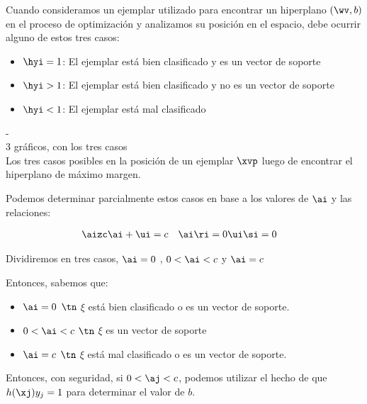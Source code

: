 Cuando consideramos un ejemplar utilizado para encontrar un hiperplano $(\wv,b)$ en el proceso de optimización y analizamos su posición en el espacio, debe ocurrir alguno de estos tres casos:

\begin{itemize}
\item $\hyi =1$: El ejemplar está bien clasificado y es un vector de soporte 
\item $\hyi >1$: El ejemplar está bien clasificado y no es un vector de soporte 
\item $\hyi <1$: El ejemplar está mal clasificado
\end{itemize}

-\\
3 gráficos, con los tres casos\\
Los tres casos posibles en la posición de un ejemplar $\xvp$ luego de encontrar el hiperplano de máximo margen.

Podemos determinar parcialmente estos casos en base a los valores de $\ai$ y las relaciones:

\begin{align*}
\aizc & \ai+\ui=c & \ai \ri = 0 & \ui \si =0 
\end{align*}

Dividiremos en tres casos, $\ai =0$ , $0 <\ai < c$ y $\ai = c$


Entonces, sabemos que:

\begin{itemize}
\item $\ai =0$ $\tn$ $\xi$ está bien clasificado o es un vector de soporte.
\item $0 <\ai < c$ $\tn$ $\xi$ es un vector de soporte
\item $\ai = c$ $\tn$ $\xi$ está mal clasificado o es un vector de soporte.
\end{itemize}
 
Entonces, con seguridad, si $0 <\aj < c$, podemos utilizar el hecho de que $h(\xj) y_j =1 $ para determinar el valor de $b$. 

